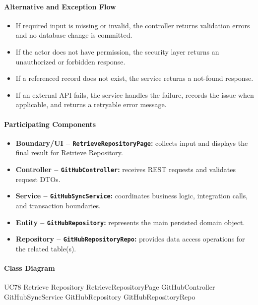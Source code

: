 \paragraph{Alternative and Exception Flow}

\begin{itemize}
    \item If required input is missing or invalid, the controller returns validation errors and no database change is committed.
    \item If the actor does not have permission, the security layer returns an unauthorized or forbidden response.
    \item If a referenced record does not exist, the service returns a not-found response.
    \item If an external API fails, the service handles the failure, records the issue when applicable, and returns a retryable error message.
\end{itemize}

\paragraph{Participating Components}

\begin{itemize}
    \item \textbf{Boundary/UI -- \texttt{RetrieveRepositoryPage}:} collects input and displays the final result for Retrieve Repository.
    \item \textbf{Controller -- \texttt{GitHubController}:} receives REST requests and validates request DTOs.
    \item \textbf{Service -- \texttt{GitHubSyncService}:} coordinates business logic, integration calls, and transaction boundaries.
    \item \textbf{Entity -- \texttt{GitHubRepository}:} represents the main persisted domain object.
    \item \textbf{Repository -- \texttt{GitHubRepositoryRepo}:} provides data access operations for the related table(s).
\end{itemize}

\paragraph{Class Diagram}

\ClassDiagram
{UC78 Retrieve Repository}
{RetrieveRepositoryPage}
{GitHubController}
{GitHubSyncService}
{GitHubRepository}
{GitHubRepositoryRepo}

